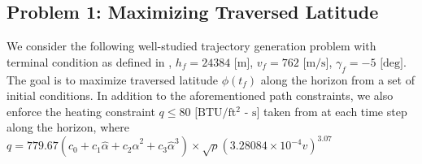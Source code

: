 \documentclass{UnderReview}
\begin{document}
\subsection{Problem 1: Maximizing Traversed Latitude}\label{section:TraversedLatitude}
We consider the following well-studied trajectory generation problem with terminal condition as defined in \cite{betts2010practical}, $h_f=24384\text{ [m]}$, $v_f =762\text{ [m/s]}$, $\gamma_f = -5\text{ [deg]}$.  
The goal is to maximize traversed latitude $\phi(t_f)$ along the horizon from a set of initial conditions.
In addition to the aforementioned path constraints, we also enforce the heating constraint $q \leq 80 \text{ [BTU/ft$^2$ - s]}$ taken from \cite{betts2010practical} at each time step along the horizon, where
$q = 779.67 (c_0 + c_1\hat\alpha + c_2\hat\alpha^2 + c_3\hat\alpha^3) \times \sqrt{\rho}(3.28084\times 10^{-4} v)^{3.07}$
\end{document}
